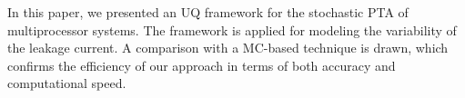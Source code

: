 In this paper, we presented an UQ framework for the stochastic PTA of multiprocessor systems. The framework is applied for modeling the variability of the leakage current. A comparison with a MC-based technique is drawn, which confirms the efficiency of our approach in terms of both accuracy and computational speed.
